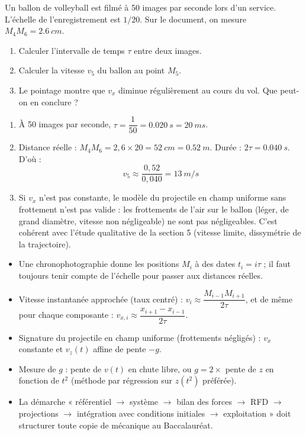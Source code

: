 \documentclass[11pt]{article}
\newcommand{\cle}[1]{{\popxbold\color{popdark}#1}}
\begin{document}
\begin{exercice}
Un ballon de volleyball est filmé à 50 images par seconde lors d'un service. L'échelle de l'enregistrement est $1/20$. Sur le document, on mesure $M_4M_6 = \SI{2,6}{cm}$.
\begin{enumerate}
\item Calculer l'intervalle de temps $\tau$ entre deux images.
\item Calculer la vitesse $v_5$ du ballon au point $M_5$.
\item Le pointage montre que $v_x$ diminue régulièrement au cours du vol. Que peut-on en conclure ?
\end{enumerate}
\end{exercice}

\begin{corrige}
\begin{enumerate}
\item À 50 images par seconde, $\tau = \dfrac{1}{50} = \SI{0,020}{s} = \SI{20}{ms}$.
\item Distance réelle : $M_4M_6 = 2,6 \times 20 = \SI{52}{cm} = \SI{0,52}{m}$. Durée : $2\tau = \SI{0,040}{s}$. D'où :
\[ v_5 \approx \dfrac{0,52}{0,040} = \SI{13}{m/s} \]
\item Si $v_x$ n'est pas constante, le modèle du projectile en champ uniforme sans frottement n'est pas valide : les frottements de l'air sur le ballon (léger, de grand diamètre, vitesse non négligeable) ne sont pas négligeables. C'est cohérent avec l'étude qualitative de la section 5 (vitesse limite, dissymétrie de la trajectoire).
\end{enumerate}
\end{corrige}

\begin{aretenir}
\begin{itemize}
\item Une chronophotographie donne les positions $M_i$ à des dates $t_i = i\tau$ ; il faut toujours tenir compte de l'\cle{échelle} pour passer aux distances réelles.
\item Vitesse instantanée approchée (taux centré) : $v_i \approx \dfrac{M_{i-1}M_{i+1}}{2\tau}$, et de même pour chaque composante : $v_{x,i} \approx \dfrac{x_{i+1}-x_{i-1}}{2\tau}$.
\item Signature du projectile en champ uniforme (frottements négligés) : $v_x$ constante et $v_z(t)$ affine de pente $-g$.
\item Mesure de $g$ : pente de $v(t)$ en chute libre, ou $g = 2\times$ pente de $z$ en fonction de $t^2$ (méthode par régression sur $z(t^2)$ préférée).
\item La démarche « référentiel $\to$ système $\to$ bilan des forces $\to$ RFD $\to$ projections $\to$ intégration avec conditions initiales $\to$ exploitation » doit structurer toute copie de mécanique au Baccalauréat.
\end{itemize}
\end{aretenir}
\end{document}
